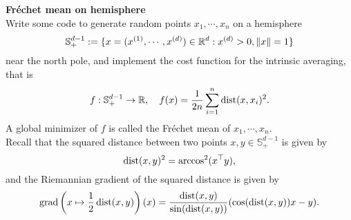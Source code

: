 \documentclass[en, oneside]{assignment}
\begin{document}
\begin{prob} \textbf{Fréchet mean on hemisphere}\\
    Write some code to generate random points $x_1, \cdots, x_n$ on a hemisphere
    \begin{equation*}
        \mathbb S ^{d-1}_+:= \{x = (x^{(1)}, \cdots, x^{(d)}) \in \mathbb R^d : x^{(d)} > 0, \left\lVert x\right\rVert = 1\}
    \end{equation*}
    near the north pole, and implement the cost function for the intrinsic averaging, that is
    \begin{equation*}
        f: \mathbb S ^{d-1}_+ \rightarrow \mathbb R, \quad f(x) = \frac{1}{2n} \sum_{i=1}^n \operatorname{dist} (x, x_i)^2.
    \end{equation*}
    A global minimizer of $f$ is called the Fréchet mean of $x_1, \cdots, x_n$.\\
    Recall that the squared distance between two points $x, y \in \mathbb S ^{d-1}_+$ is given by
    \begin{equation*}
        \operatorname{dist}(x, y)^2 = \arccos^2(x^\top y),
    \end{equation*}
    and the Riemannian gradient of the squared distance is given by
    \begin{equation*}
        \operatorname{grad} \left(x \mapsto \frac{1}{2} \operatorname{dist} (x, y)\right)(x) = \frac{\operatorname{dist}(x, y)}{\sin(\operatorname{dist}(x, y))} (\cos(\operatorname{dist}(x, y)) x - y).
    \end{equation*}
\end{prob}
\end{document}
